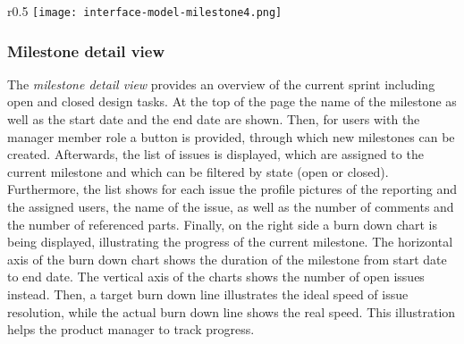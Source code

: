 \begin{wrapfigure}{r}{0.5\textwidth}
    \centering
    \texttt{[image: interface-model-milestone4.png]}
    \label{fig:screenshot-milestone}
\end{wrapfigure}

\subsubsection{Milestone detail view}

The \textit{milestone detail view} provides an overview of the current sprint including open and closed design tasks.
At the top of the page the name of the milestone as well as the start date and the end date are shown.
Then, for users with the manager member role a button is provided, through which new milestones can be created.
Afterwards, the list of issues is displayed, which are assigned to the current milestone and which can be filtered by state (open or closed).
Furthermore, the list shows for each issue the profile pictures of the reporting and the assigned users, the name of the issue, as well as the number of comments and the number of referenced parts.
Finally, on the right side a burn down chart is being displayed, illustrating the progress of the current milestone.
The horizontal axis of the burn down chart shows the duration of the milestone from start date to end date.
The vertical axis of the charts shows the number of open issues instead.
Then, a target burn down line illustrates the ideal speed of issue resolution, while the actual burn down line shows the real speed.
This illustration helps the product manager to track progress.